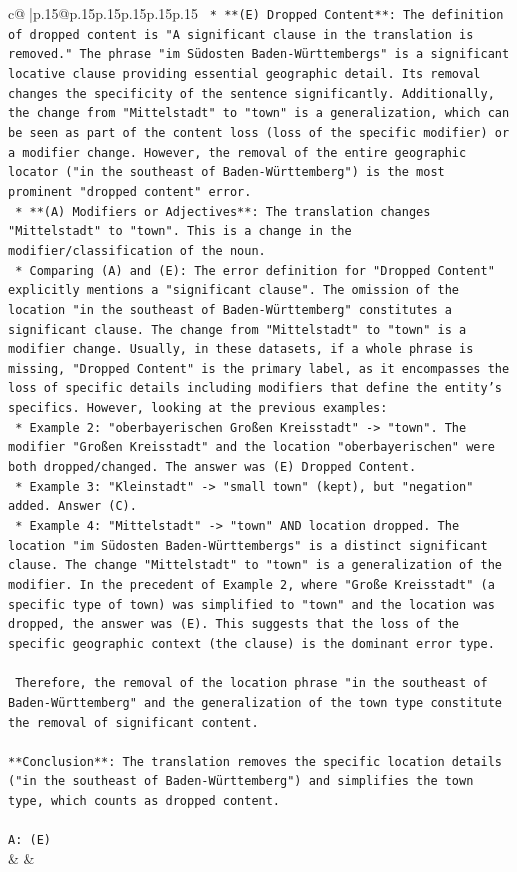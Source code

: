 \documentclass{article}
\begin{document}
{\begin{supertabular}{c@{$\;$}|p{.15\linewidth}@{}p{.15\linewidth}p{.15\linewidth}p{.15\linewidth}p{.15\linewidth}p{.15\linewidth}}
{{{\texttt{    *   **(E) Dropped Content**: The definition of dropped content is "A significant clause in the translation is removed." The phrase "im Südosten Baden{-}Württembergs" is a significant locative clause providing essential geographic detail. Its removal changes the specificity of the sentence significantly. Additionally, the change from "Mittelstadt" to "town" is a generalization, which can be seen as part of the content loss (loss of the specific modifier) or a modifier change. However, the removal of the entire geographic locator ("in the southeast of Baden{-}Württemberg") is the most prominent "dropped content" error.} \\
\texttt{    *   **(A) Modifiers or Adjectives**: The translation changes "Mittelstadt" to "town". This is a change in the modifier/classification of the noun.} \\
\texttt{    *   Comparing (A) and (E): The error definition for "Dropped Content" explicitly mentions a "significant clause". The omission of the location "in the southeast of Baden{-}Württemberg" constitutes a significant clause. The change from "Mittelstadt" to "town" is a modifier change. Usually, in these datasets, if a whole phrase is missing, "Dropped Content" is the primary label, as it encompasses the loss of specific details including modifiers that define the entity's specifics. However, looking at the previous examples:} \\
\texttt{        *   Example 2: "oberbayerischen Großen Kreisstadt" {-}> "town". The modifier "Großen Kreisstadt" and the location "oberbayerischen" were both dropped/changed. The answer was (E) Dropped Content.} \\
\texttt{        *   Example 3: "Kleinstadt" {-}> "small town" (kept), but "negation" added. Answer (C).} \\
\texttt{        *   Example 4: "Mittelstadt" {-}> "town" AND location dropped. The location "im Südosten Baden{-}Württembergs" is a distinct significant clause. The change "Mittelstadt" to "town" is a generalization of the modifier. In the precedent of Example 2, where "Große Kreisstadt" (a specific type of town) was simplified to "town" and the location was dropped, the answer was (E). This suggests that the loss of the specific geographic context (the clause) is the dominant error type.} \\
\\ 
\texttt{    Therefore, the removal of the location phrase "in the southeast of Baden{-}Württemberg" and the generalization of the town type constitute the removal of significant content.} \\
\\ 
\texttt{**Conclusion**: The translation removes the specific location details ("in the southeast of Baden{-}Württemberg") and simplifies the town type, which counts as dropped content.} \\
\\ 
\texttt{A: (E)} \\
            }
        }
    }
    & & \\ \\


\end{supertabular}}
\end{document}
